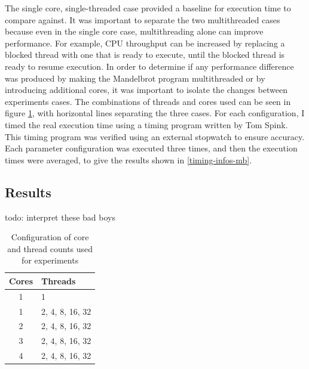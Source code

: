 \documentclass[bsc,frontabs,twoside,singlespacing,parskip,deptreport]{infthesis}     %
\begin{document}
The single core, single-threaded case provided a baseline for execution time to compare against. It was important to separate the two multithreaded cases because even in the single core case, multithreading alone can improve performance. For example, CPU throughput can be increased by replacing a blocked thread with one that is ready to execute, until the blocked thread is ready to resume execution. In order to determine if any performance difference was produced by making the Mandelbrot program multithreaded or by introducing additional cores, it was important to isolate the changes between experiments cases. The combinations of threads and cores used can be seen in figure \ref{cores-threads}, with horizontal lines separating the three cases. For each configuration, I timed the real execution time using a timing program written by Tom Spink. This timing program was verified using an external stopwatch to ensure accuracy. Each parameter configuration was executed three times, and then the execution times were averaged, to give the results shown in \ref{timing-infos-mb}. \\

\subsection{Results} \label{mb-benchmark-results}
todo: interpret these bad boys

\begin{table}[h]
    \centering
    \begin{tabular}{cl}
         Cores & Threads \\
         \toprule
         1 & 1 \\
         \midrule
         1 & 2, 4, 8, 16, 32 \\
         \midrule
         2 & 2, 4, 8, 16, 32 \\
         3 & 2, 4, 8, 16, 32 \\
         4 & 2, 4, 8, 16, 32 \\
    \end{tabular}
    \caption{Configuration of core and thread counts used for experiments}
    \label{cores-threads}
\end{table}
\end{document}
